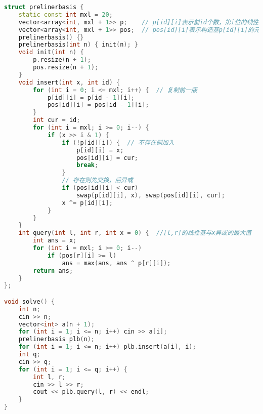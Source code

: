 \begin{lstlisting}[language=C++]
struct prelinerbasis {
    static const int mxl = 20;
    vector<array<int, mxl + 1>> p;    // p[id][i]表示前id个数，第i位的线性基
    vector<array<int, mxl + 1>> pos;  // pos[id][i]表示构造基p[id][i]的元素的下标最大值
    prelinerbasis() {}
    prelinerbasis(int n) { init(n); }
    void init(int n) {
        p.resize(n + 1);
        pos.resize(n + 1);
    }
    void insert(int x, int id) {
        for (int i = 0; i <= mxl; i++) {  // 复制前一版
            p[id][i] = p[id - 1][i];
            pos[id][i] = pos[id - 1][i];
        }
        int cur = id;
        for (int i = mxl; i >= 0; i--) {
            if (x >> i & 1) {
                if (!p[id][i]) {  // 不存在则加入
                    p[id][i] = x;
                    pos[id][i] = cur;
                    break;
                }
                // 存在则先交换，后异或
                if (pos[id][i] < cur)
                    swap(p[id][i], x), swap(pos[id][i], cur);
                x ^= p[id][i];
            }
        }
    }
    int query(int l, int r, int x = 0) {  //[l,r]的线性基与x异或的最大值
        int ans = x;
        for (int i = mxl; i >= 0; i--)
            if (pos[r][i] >= l)
                ans = max(ans, ans ^ p[r][i]);
        return ans;
    }
};

void solve() {
    int n;
    cin >> n;
    vector<int> a(n + 1);
    for (int i = 1; i <= n; i++) cin >> a[i];
    prelinerbasis plb(n);
    for (int i = 1; i <= n; i++) plb.insert(a[i], i);
    int q;
    cin >> q;
    for (int i = 1; i <= q; i++) {
        int l, r;
        cin >> l >> r;
        cout << plb.query(l, r) << endl;
    }
}
\end{lstlisting}

